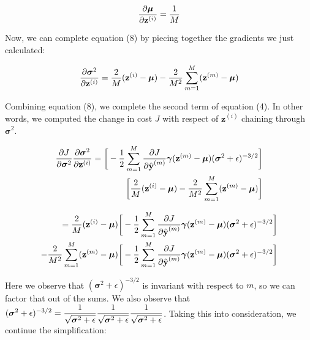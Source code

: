 \documentclass{article}
\begin{document}
\begin{multicols}{2}
\begin{equation}
    {\partial \boldsymbol{\mu} \over \partial \textbf{z}^{(i)}} = 
    {1\over M} 
\end{equation}

Now, we can complete equation (8) by piecing together the gradients 
we just calculated:

\begin{equation}
    {\partial \boldsymbol{\sigma}^2 \over \partial \textbf{z}^{(i)}} = 
    {2 \over M} (\textbf{z}^{(i)} - \boldsymbol{\mu})
    -{2 \over M^2} \sum_{m=1}^M (\textbf{z}^{(m)} - \boldsymbol{\mu}) \notag
\end{equation}

Combining equation (8), we complete the second term of equation (4).
In other words, we computed the change in cost $J$ with respect of 
$\textbf{z}^{(i)}$ chaining through $\boldsymbol{\sigma}^2$.

$$
\begin{aligned}
    {\partial J \over \partial \boldsymbol{\sigma}^2} 
    {\partial \boldsymbol{\sigma}^2 \over \partial \textbf{z}^{(i)}} = 
    \bigg[
    -{1\over 2}
    \sum_{m = 1}^M {\partial J \over \partial \hat{\textbf{y}}^{(m)}} 
    \boldsymbol{\gamma}
    (\textbf{z}^{(m)} - \boldsymbol{\mu}) (\boldsymbol{\sigma}^2 + \epsilon)^{-3/2} \bigg]\\
    \bigg[{2 \over M} (\textbf{z}^{(i)} - \boldsymbol{\mu})
    -{2 \over M^2} \sum_{m=1}^M (\textbf{z}^{(m)} - \boldsymbol{\mu})\bigg]
\end{aligned}
$$
    
$$ \begin{aligned}
    = {2 \over M} (\textbf{z}^{(i)} - \boldsymbol{\mu}) \bigg[
    -{1\over 2}
    \sum_{m = 1}^M {\partial J \over \partial \hat{\textbf{y}}^{(m)}} 
    \boldsymbol{\gamma}
    (\textbf{z}^{(m)} - \boldsymbol{\mu}) (\boldsymbol{\sigma}^2 + \epsilon)^{-3/2} \bigg]\\
    -{2 \over M^2} \sum_{m=1}^M (\textbf{z}^{(m)} - \boldsymbol{\mu})
    \bigg[
    -{1\over 2}
    \sum_{m = 1}^M {\partial J \over \partial \hat{\textbf{y}}^{(m)}} 
    \boldsymbol{\gamma}
    (\textbf{z}^{(m)} - \boldsymbol{\mu}) (\boldsymbol{\sigma}^2 + \epsilon)^{-3/2} \bigg]
\end{aligned}$$

Here we observe that $(\boldsymbol{\sigma}^2 + \epsilon)^{-3/2}$ is invariant 
with respect to $m$, so we can factor that out of the sums. We also observe
that $\begin{aligned}
    (\boldsymbol{\sigma}^2 + \epsilon)^{-3/2} = 
    {1\over \sqrt{\boldsymbol{\sigma}^2 + \epsilon}}
    {1\over \sqrt{\boldsymbol{\sigma}^2 + \epsilon}}
    {1\over \sqrt{\boldsymbol{\sigma}^2 + \epsilon}}
\end{aligned}$. Taking this into consideration, we continue the simplification:


\end{multicols}
\end{document}
